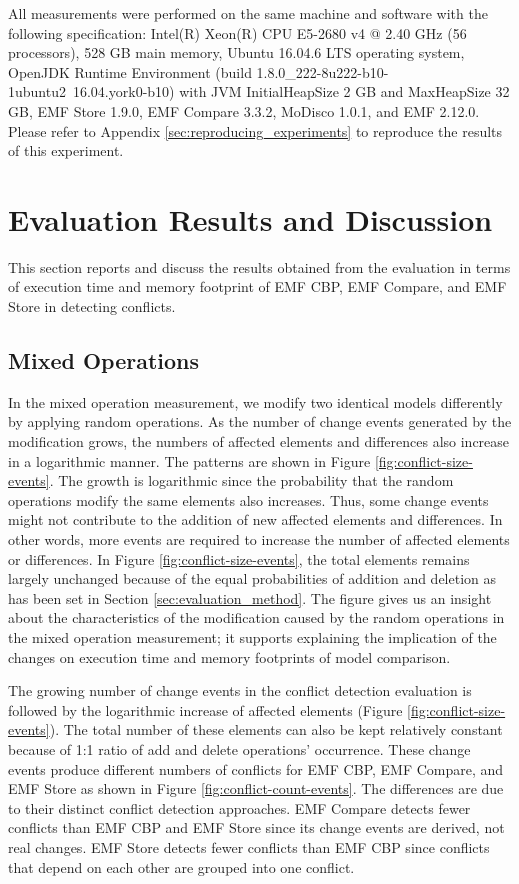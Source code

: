 All measurements were performed on the same machine and software with the following specification: Intel(R) Xeon(R) CPU E5-2680 v4 @ 2.40 GHz (56 processors), 528 GB main memory, Ubuntu 16.04.6 LTS operating system, OpenJDK Runtime Environment (build 1.8.0\_222-8u222-b10-1ubuntu2~16.04.york0-b10) with JVM \textsf{InitialHeapSize} 2 GB and \textsf{MaxHeapSize} 32 GB, EMF Store 1.9.0, EMF Compare 3.3.2, MoDisco 1.0.1, and EMF 2.12.0. Please refer to Appendix \ref{sec:reproducing_experiments} to reproduce the results of this experiment.

\section{Evaluation Results and Discussion}
\label{sec:evaluation_discussion}
This section reports and discuss the results obtained from the evaluation in terms of execution time and memory footprint of EMF CBP, EMF Compare, and EMF Store in detecting conflicts.

\subsection{Mixed Operations}
\label{sec:mixed-operation_conflict}

In the mixed operation measurement, we modify two identical models differently by applying random operations. As the number of change events generated by the modification grows, the numbers of affected elements and differences also increase in a logarithmic manner. The patterns are shown in Figure \ref{fig:conflict-size-events}. The growth is logarithmic since the probability that the random operations modify the same elements also increases. Thus, some change events might not contribute to the addition of new affected elements and differences. In other words, more events are required to increase the number of affected elements or differences. In Figure \ref{fig:conflict-size-events}, the total elements remains largely unchanged because of the equal probabilities of addition and deletion as has been set in Section \ref{sec:evaluation_method}. The figure gives us an insight about the characteristics of the modification caused by the random operations in the mixed operation measurement; it supports explaining the implication of the changes on execution time and memory footprints of model comparison.

The growing number of change events in the conflict detection evaluation is followed by the logarithmic increase of affected elements (Figure \ref{fig:conflict-size-events}). The total number of these elements can also be kept relatively constant because of 1:1 ratio of \textsf{add} and \textsf{delete} operations’ occurrence. These change events produce different numbers of conflicts for EMF CBP, EMF Compare, and EMF Store as shown in Figure \ref{fig:conflict-count-events}. The differences are due to their distinct conflict detection approaches. EMF Compare detects fewer conflicts than EMF CBP and EMF Store since its change events are derived, not real changes. EMF Store detects fewer conflicts than EMF CBP since conflicts that depend on each other are grouped into one conflict.


